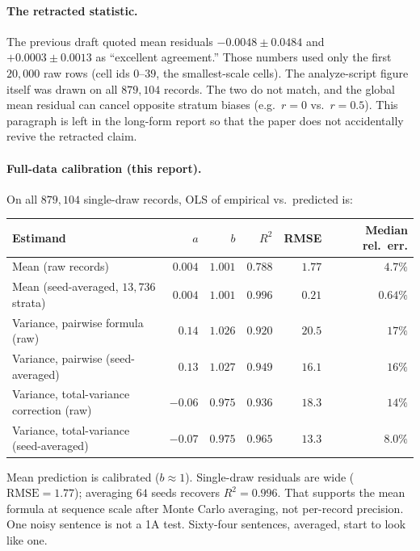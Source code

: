 \documentclass[11pt,a4paper]{report}
\begin{document}
\paragraph{The retracted statistic.}
The previous draft quoted mean residuals $-0.0048\pm 0.0484$ and $+0.0003\pm 0.0013$ as ``excellent agreement.'' Those numbers used only the first $20{,}000$ raw rows (cell ids $0$--$39$, the smallest-scale cells). The analyze-script figure itself was drawn on all $879{,}104$ records. The two do not match, and the global mean residual can cancel opposite stratum biases (e.g.\ $r=0$ vs.\ $r=0.5$). This paragraph is left in the long-form report so that the paper does not accidentally revive the retracted claim.

\paragraph{Full-data calibration (this report).}
On all $879{,}104$ single-draw records, OLS of empirical vs.\ predicted is:

\begin{center}
{\small
\begin{tabular}{lrrrrr}
\toprule
Estimand & $a$ & $b$ & $R^2$ & RMSE & Median rel.\ err. \\
\midrule
Mean (raw records) & $0.004$ & $1.001$ & $0.788$ & $1.77$ & $4.7\%$ \\
Mean (seed-averaged, $13{,}736$ strata) & $0.004$ & $1.001$ & $0.996$ & $0.21$ & $0.64\%$ \\
Variance, pairwise formula (raw) & $0.14$ & $1.026$ & $0.920$ & $20.5$ & $17\%$ \\
Variance, pairwise (seed-averaged) & $0.13$ & $1.027$ & $0.949$ & $16.1$ & $16\%$ \\
Variance, total-variance correction (raw) & $-0.06$ & $0.975$ & $0.936$ & $18.3$ & $14\%$ \\
Variance, total-variance (seed-averaged) & $-0.07$ & $0.975$ & $0.965$ & $13.3$ & $8.0\%$ \\
\bottomrule
\end{tabular}}
\end{center}

Mean prediction is calibrated ($b\approx 1$). Single-draw residuals are wide ($\mathrm{RMSE}=1.77$); averaging $64$ seeds recovers $R^2=0.996$. That supports the mean formula at sequence scale after Monte Carlo averaging, not per-record precision. One noisy sentence is not a 1A test. Sixty-four sentences, averaged, start to look like one.
\end{document}
